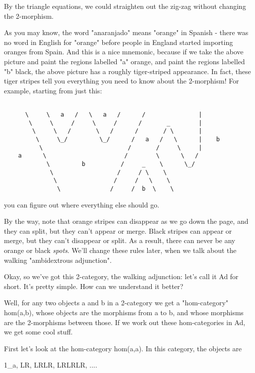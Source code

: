 By the triangle equations, we could straighten out the zig-zag without
changing the 2-morphism.

As you may know, the word "anaranjado" means
"orange" in Spanish - there was no word in English for
"orange" before people in England started importing oranges
from Spain.  And this is a nice mnemonic, because if we take the above
picture and paint the regions labelled "a" orange, and paint
the regions labelled "b" black, the above picture has a
roughly tiger-striped appearance.  In fact, these tiger stripes tell you
everything you need to know about the 2-morphism!  For example, starting
from just this:


\begin{verbatim}

      \     \   a   /   \   a   /      /               |
       \     \     /     \     /      /       _        |
        \     \   /       \   /      /       / \       |
         \     \_/         \_/      /   a   /   \      |    b
          \                        /       /     \     |
    a      \                      /        \      \   / 
            \         b          /     _    \      \_/ 
             \                  /     / \    \      
              \                /     /   \    \       
               \              /     /  b  \    \  
\end{verbatim}
    
you can figure out where everything else should go.


By the way, note that orange stripes can disappear as we go down the
page, and they can split, but they can't appear or merge.  Black stripes
can appear or merge, but they can't disappear or split.  As a result,
there can never be any orange or black \emph{spots}.  We'll change
these rules later, when we talk about the walking "ambidextrous
adjunction".

Okay, so we've got this 2-category, the walking adjunction: let's call
it Ad for short.  It's pretty simple.  How can we understand it better?


Well, for any two objects a and b in a 2-category we get a
"hom-category" hom(a,b), whose objects are the morphisms from
a to b, and whose morphisms are the 2-morphisms between those.  If we
work out these hom-categories in Ad, we get some cool stuff.

First let's look at the hom-category hom(a,a).   In this category,
the objects are 

1_{a}, LR, LRLR, LRLRLR, ....

